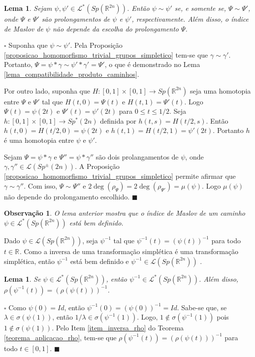 \documentclass[12pt]{book}
\newtheorem{lema}[teorema]{Lema}
\newtheorem{observacao}[teorema]{Observação}
\newenvironment{prova}[1]{$\square$ #1}{\hfill$\blacksquare$}
\newcommand{\caminhos}{\mathcal{L}}
\newcommand{\dominioMaslov}{\caminhos^{*}(\gruposimpletico{\real{2n}})}
\newcommand{\espectrooperador}[1]{\sigma(#1)}
\newcommand{\gruposimpletico}[1]{Sp(#1)}
\newcommand{\gruposimpleticonaodegenerado}[1]{Sp^{#1}(2n)}
\newcommand{\intervalo}{[0,1]}
\newcommand{\real}[1]{\mathbb{R}^{#1}}
\newcommand{\reta}{\real{}}
\begin{document}
	\begin{lema}\label{lema_independencia_prolongamento}
		Sejam $\psi,\psi' \in  \dominioMaslov$. Então $\psi \sim \psi'$ se, e somente se, $\Psi \sim \Psi'$, onde $\Psi$ e $\Psi'$ são prolongamentos de $\psi$ e $\psi'$, respectivamente. Além disso, o índice de Maslov de $\psi$ não depende da escolha do prolongamento $\Psi$.
	\end{lema}
	\begin{prova}
		Suponha que $\psi \sim \psi'$. Pela Proposição \ref{proposicao_homomorfismo_trivial_grupos_simpletico} tem-se que $\gamma\sim \gamma'$. Portanto, $\Psi = \psi*\gamma \sim \psi'*\gamma' = \Psi'$, o que é demonstrado no Lema \ref{lema_compatibilidade_produto_caminhos}. 
		
		Por outro lado, suponha que $H: \intervalo \times \intervalo \to \gruposimpletico{\real{2n}}$ seja uma homotopia entre $\Psi $ e $\Psi'$ tal que $H(t,0) = \Psi(t)$ e $H(t,1) = \Psi'(t)$. Logo $\Psi(t) = \psi(2t)$ e $\Psi'(t) = \psi'(2t)$ para $0 \leq t \leq 1/2$. Seja $h: \intervalo \times \intervalo \to \gruposimpleticonaodegenerado{*}$ definida por $h(t,s) = H(t/2, s)$. Então  $h(t,0) = H(t/2, 0) =  \psi(2t)$ e $h(t,1)=H(t/2,1) = \psi'(2t)$. Portanto $h$ é uma homotopia entre $\psi$ e $\psi'$.
		
		Sejam $\Psi=\psi*\gamma$ e $\Psi''=\psi*\gamma''$ são dois prolangamentos de $\psi$, onde $\gamma, \gamma''\in \caminhos(\gruposimpleticonaodegenerado{\pm})$. A Proposição \ref{proposicao_homomorfismo_trivial_grupos_simpletico} permite afirmar que $\gamma\sim \gamma''$. Com isso, $\Psi\sim \Psi''$ e $2\deg(\rho_{\Psi})=2\deg(\rho_{\Psi'})=\mu(\psi)$. Logo $\mu(\psi)$ não depende do prolongamento escolhido.
	\end{prova}
	
	\begin{observacao}
		O lema anterior mostra que o índice de Maslov de um caminho $\psi\in \dominioMaslov$ está bem definido.
	\end{observacao}
	
	Dado $\psi\in \caminhos(\gruposimpletico{\real{2n}})$, seja $\psi^{-1}$ tal que $\psi^{-1}(t) = (\psi(t))^{-1}$ para todo $t\in \reta$. Como a inversa de uma transformação simplética é uma transformação simplética, então $\psi^{-1}$ está bem definido e $\psi^{-1} \in \caminhos(\gruposimpletico{\real{2n}})$ .
	
	\begin{lema}\label{lema_inversa_caminho_especial}
		Se $\psi \in   \dominioMaslov$, então $\psi^{-1} \in  \dominioMaslov$. Além disso, $\rho(\psi^{-1}(t)) = (\rho(\psi(t)))^{-1}$.
	\end{lema}
	\begin{prova}
		Como $\psi(0) = Id$, então $\psi^{-1}(0) = (\psi(0))^{-1} = Id$. Sabe-se que, se $\lambda\in \espectrooperador{\psi(1)}$, então $1/\lambda\in \espectrooperador{\psi^{-1}(1)}$. Logo, $1\notin \espectrooperador{\psi^{-1}(1)}$ pois $1\notin \espectrooperador{\psi(1)}$. Pelo Item \ref{item_inversa_rho} do Teorema \ref{teorema_aplicacao_rho}, tem-se que $\rho(\psi^{-1}(t))= (\rho(\psi(t)))^{-1}$ para todo $t\in \intervalo$.
	\end{prova}
	
\end{document}
